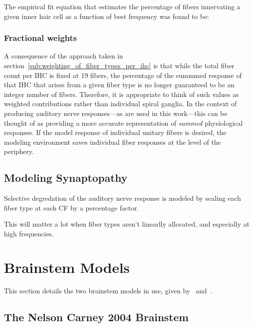 The empirical fit equation that estimates the percentage of fibers innervating a given inner hair cell as a function of best frequency was found to be: 

\subsubsection{Fractional weights}
A consequence of the approach taken in section~\ref{sub:weighting_of_fiber_types_per_ihc} is that while the total fiber count per IHC is fixed at 19 fibers, the percentage of the summmed response of that IHC that arises from a given fiber type is no longer guaranteed to be an integer number of fibers.  Therefore, it is appropriate to think of such values as weighted contributions rather than individual spiral ganglia.  In the context of producing auditory nerve responses---as are used in this work---this can be thought of as providing a more accurate representation of \emph{summed} physiological responses. If the model response of individual unitary fibers is desired, the modeling environment saves individual fiber responses at the level of the periphery.

\subsection{Modeling Synaptopathy} %
\label{sub:modeling_synaptopathy}
Selective degredation of the auditory nerve response is modeled by scaling each fiber type at each CF by a percentage factor.  

This will matter a lot when fiber types aren't linearlly allocated, and especially at high frequencies.

\section{Brainstem Models} %
\label{sec:brainstem_models}
This section details the two brainstem models in use, given by~\cite{Nelson2004Phenomenological} and~\cite{Carney2015Speech}.

\subsection{The Nelson Carney 2004 Brainstem} %
\label{sub:the_nelson_carney_2004_brainstem}

